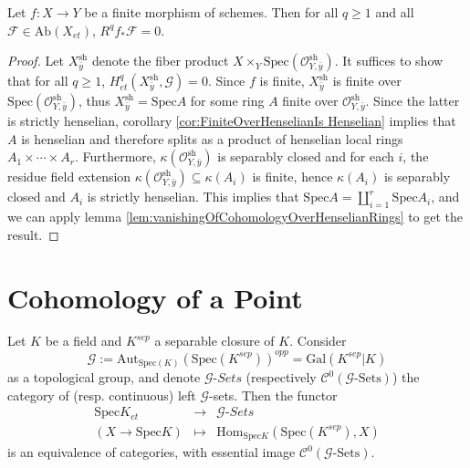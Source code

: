 \begin{proposition} \label{prop:FiniteHigherDirectImagesVanish}
Let $f: X\to Y$ be a finite morphism of schemes. Then for all $q\geq 1$ and all 
$\mathcal{F}\in \text{Ab}(X_{et})$, $R^q f_*\mathcal{F}=0$. 
\end{proposition}

\begin{proof}
Let $X_{\bar y}^\text{sh}$ denote the fiber product $X\times_Y 
\text{Spec}(\mathcal{O}_{Y, \bar y}^\text{sh})$. It suffices to show that for 
all $q\geq 1$, $H_{et}^q(X_{\bar y}^\text{sh}, \mathcal{G})=0$. Since $f$ is 
finite, $X_{\bar y}^\text{sh}$ is finite over $\text{Spec}(\mathcal{O}_{Y, \bar 
y}^\text{sh})$, thus $X_{\bar y}^\text{sh} = \text{Spec} A$ for some ring $A$ 
finite over $\mathcal{O}_{Y, \bar y}^\text{sh}$. Since the latter is strictly 
henselian, corollary \ref{cor:FiniteOverHenselianIs Henselian} implies that $A$ 
is henselian and therefore splits as a product of henselian local rings $A_1 
\times \cdots \times A_r$. Furthermore, $\kappa(\mathcal{O}_{Y, \bar 
y}^\text{sh})$ is separably closed and for each $i$, the residue field 
extension $\kappa(\mathcal{O}_{Y, \bar y}^\text{sh}) \subseteq \kappa(A_i)$ is 
finite, hence $\kappa(A_i)$ is separably closed  and $A_i$ is strictly 
henselian. This implies that $\text{Spec} A = \coprod_{i=1}^r \text{Spec} A_i$, 
and we can apply lemma \ref{lem:vanishingOfCohomologyOverHenselianRings} to get 
the result.
\end{proof}

\section{Cohomology of a Point}
\label{section-cohomology-point}

\begin{lemma}
Let $K$ be a field and $K^{sep}$ a separable closure of $K$. Consider
$$
\mathcal{G} := \text{Aut}_{\text{Spec}(K)}(\text{Spec}(K^{sep}))^{opp}  = 
\text{Gal}(K^{sep} | K)
$$
as a topological group, and denote $\mathcal{G}\textit{-Sets}$ (respectively 
$\mathcal{C}^0(\mathcal{G}\text{-Sets})$) the category of (resp. continuous) 
left $\mathcal{G}$-sets. Then the functor
$$
\begin{matrix}
\text{Spec} K _{et} &  \longrightarrow & \mathcal{G}\textit{-Sets} \\
(X\to\text{Spec} K) & \longmapsto & \text{Hom}_{\text{Spec} 
K}\left(\text{Spec}(K^{sep}), X\right)
\end{matrix}
$$
is an equivalence of categories, with essential image 
$\mathcal{C}^0(\mathcal{G}\text{-Sets})$.
\end{lemma}


